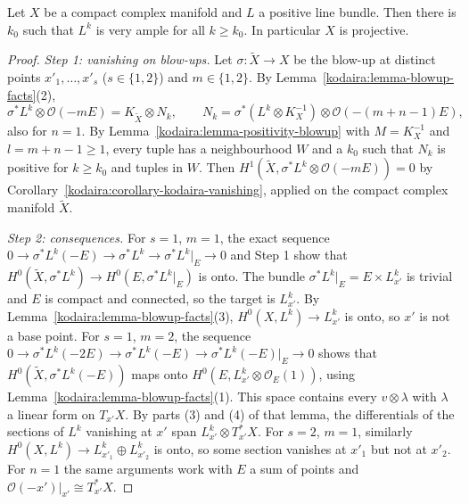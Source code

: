 \begin{theorem}\label{kodaira:theorem-embedding}
Let $X$ be a compact complex manifold and $L$ a positive line bundle. Then there is $k_0$ such that $L^k$ is very ample for all $k \geq k_0$. In
particular $X$ is projective.
\end{theorem}

\begin{proof}
\emph{Step 1: vanishing on blow-ups.} Let $\sigma \colon \tilde X \to X$ be the blow-up at distinct points $x'_1, \ldots, x'_s$ ($s \in \{1, 2\}$) and
$m \in \{1, 2\}$. By Lemma~\ref{kodaira:lemma-blowup-facts}(2),
\[
\sigma^*L^k \otimes \mathcal{O}(-mE) = K_{\tilde X} \otimes N_k, \qquad N_k = \sigma^*(L^k \otimes K_X^{-1}) \otimes \mathcal{O}(-(m + n - 1)E),
\]
also for $n = 1$. By Lemma~\ref{kodaira:lemma-positivity-blowup} with $M = K_X^{-1}$ and $l = m + n - 1 \geq 1$, every tuple has a neighbourhood $W$
and a $k_0$ such that $N_k$ is positive for $k \geq k_0$ and tuples in $W$. Then $H^1(\tilde X, \sigma^*L^k \otimes \mathcal{O}(-mE)) = 0$ by
Corollary~\ref{kodaira:corollary-kodaira-vanishing}, applied on the compact complex manifold $\tilde X$.

\emph{Step 2: consequences.} For $s = 1$, $m = 1$, the exact sequence $0 \to \sigma^*L^k(-E) \to \sigma^*L^k \to \sigma^*L^k|_E \to 0$ and Step 1
show that $H^0(\tilde X, \sigma^*L^k) \to H^0(E, \sigma^*L^k|_E)$ is onto. The bundle $\sigma^*L^k|_E = E \times L^k_{x'}$ is trivial and $E$ is
compact and connected, so the target is $L^k_{x'}$. By Lemma~\ref{kodaira:lemma-blowup-facts}(3), $H^0(X, L^k) \to L^k_{x'}$ is onto, so $x'$ is not a
base point. For $s = 1$, $m = 2$, the sequence $0 \to \sigma^*L^k(-2E) \to \sigma^*L^k(-E) \to \sigma^*L^k(-E)|_E \to 0$ shows that
$H^0(\tilde X, \sigma^*L^k(-E))$ maps onto $H^0(E, L^k_{x'} \otimes \mathcal{O}_E(1))$, using Lemma~\ref{kodaira:lemma-blowup-facts}(1). This space
contains every $v \otimes \lambda$ with $\lambda$ a linear form on $T_{x'}X$. By parts (3) and (4) of that lemma, the differentials of the sections of
$L^k$ vanishing at $x'$ span $L^k_{x'} \otimes T^*_{x'}X$. For $s = 2$, $m = 1$, similarly
$H^0(X, L^k) \to L^k_{x'_1} \oplus L^k_{x'_2}$ is onto, so some section vanishes at $x'_1$ but not at $x'_2$. For $n = 1$ the same arguments work
with $E$ a sum of points and $\mathcal{O}(-x')|_{x'} \cong T^*_{x'}X$.


\end{proof}
